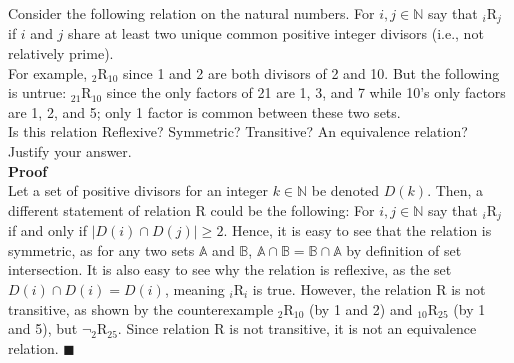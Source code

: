 \documentclass{article}
\begin{document}
Consider the following relation on the natural numbers. For $i, j \in \mathbb{N}$ say that $_i$R$_j$ if $i$ and $j$ share at least two unique common positive integer divisors (i.e., not relatively prime).\\

For example, $_2$R$_{10}$ since 1 and 2 are both divisors of 2 and 10. But the following is untrue: $_{21}$R$_{10}$ since the only factors of 21 are 1, 3, and 7 while 10's only factors are 1, 2, and 5; only 1 factor is common between these two sets.\\

Is this relation Reflexive? Symmetric? Transitive? An equivalence relation? Justify your answer.\\

\textbf{Proof} \\
Let a set of positive divisors for an integer $k \in \mathbb{N}$ be denoted $D(k)$. Then, a different statement of relation R could be the following: For $i, j \in \mathbb{N}$ say that $_i$R$_j$ if and only if $|D(i) \cap D(j)| \geq 2$. Hence, it is easy to see that the relation is symmetric, as for any two sets $\mathbb{A}$ and $\mathbb{B}$, $\mathbb{A} \cap \mathbb{B} = \mathbb{B} \cap \mathbb{A}$ by definition of set intersection. It is also easy to see why the relation is reflexive, as the set $D(i) \cap D(i) = D(i)$, meaning $_i$R$_i$ is true. However, the relation R is not transitive, as shown by the counterexample $_2$R$_{10}$ (by 1 and 2) and $_{10}$R$_{25}$ (by 1 and 5), but $\neg_2$R$_{25}$. Since relation R is not transitive, it is not an equivalence relation. \hfill$\blacksquare$
\end{document}
